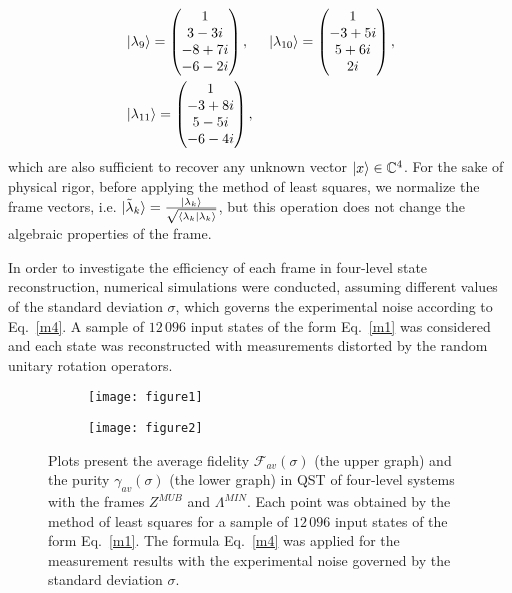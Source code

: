 \documentclass[aps,pra,reprint,groupedaddress,showkeys]{revtex4-1}
\renewcommand{\eqref}[1]{Eq.~\ref{#1}}
\begin{document}
\begin{equation}
\begin{split}
&\ket{\lambda_9} = \begin{pmatrix} 1 \\ 3-3i \\ -8+7i \\ -6-2 i \end{pmatrix}, \hspace{0.5cm} \ket{\lambda_{10}} =\begin{pmatrix} 1 \\ -3 + 5 i \\ 5+ 6 i \\ 2 i \end{pmatrix},\\
&\ket{\lambda_{11}} =\begin{pmatrix} 1  \\ -3 + 8 i \\ 5 - 5 i  \\ -6 - 4 i \end{pmatrix},
\end{split}
\end{equation}
which are also sufficient to recover any unknown vector $\ket{x} \in \mathbb{C}^4$. For the sake of physical rigor, before applying the method of least squares, we normalize the frame vectors, i.e. $\ket{\tilde{\lambda}_k} = \frac{\ket{\lambda_k}}{\sqrt{\braket{\lambda_k|\lambda_k}}}$, but this operation does not change the algebraic properties of the frame.

In order to investigate the efficiency of each frame in four-level state reconstruction, numerical simulations were conducted, assuming different values of the standard deviation $\sigma$, which governs the experimental noise according to \eqref{m4}. A sample of $12\,096$ input states of the form \eqref{m1} was considered and each state was reconstructed with measurements distorted by the random unitary rotation operators.

\begin{figure}[h]
	\centering
   \begin{subfigure}
         \centering
         \texttt{[image: figure1]}
     \end{subfigure}
     \hfill
     \begin{subfigure}
         \centering
         \texttt{[image: figure2]}
     \end{subfigure}
	\caption{Plots present the average fidelity $\mathcal{F}_{av} (\sigma)$ (the upper graph) and the purity $\gamma_{av} (\sigma)$ (the lower graph) in QST of four-level systems with the frames $Z^{MUB}$ and $\Lambda^{MIN}$. Each point was obtained by the method of least squares for a sample of $12\,096$ input states of the form \eqref{m1}. The formula \eqref{m4} was applied for the measurement results with the experimental noise governed by the standard deviation $\sigma$.}
	\label{plots1}
\end{figure}
\end{document}
